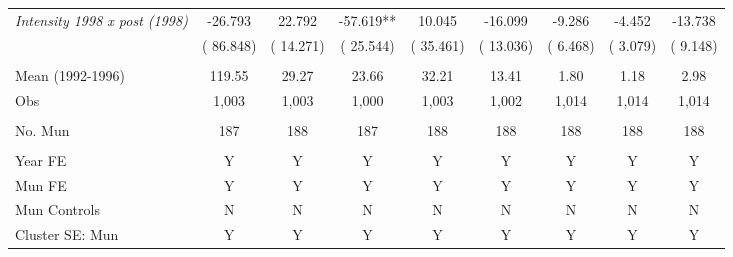 \begin{tabular}{lcccccccc}
\textit{Intensity 1998 x post (1998)} &      -26.793  &       22.792 &      -57.619** &       10.045 &      -16.099  &       -9.286 &       -4.452 &      -13.738\\  
& (      86.848)  & (      14.271) & (      25.544) & (      35.461) & (      13.036)  & (       6.468) & (       3.079) & (       9.148)\\ 
 &  & &  &  &  &  &  & \\ 
Mean (1992-1996) &       119.55  &        29.27 &        23.66 &        32.21 &        13.41  &         1.80 &         1.18  &         2.98  \\  
Obs &        1,003  &        1,003 &        1,000 &        1,003 &        1,002  &        1,014 &        1,014  &        1,014 \\ 
 &  & &  &  &  &  &  & \\ 
No. Mun &          187  &          188 &          187 &          188 &          188  &          188 &          188  &          188 \\  
&  &   &  & &  &   &  &   \\ 
Year FE & Y & Y & Y & Y & Y & Y & Y & Y  \\ 
Mun FE & Y & Y & Y & Y & Y & Y & Y & Y \\ 
Mun Controls & N  & N & N & N & N  & N & N & N    \\  
Cluster SE: Mun & Y & Y & Y & Y & Y & Y & Y & Y \\ 
\bottomrule
\end{tabular}